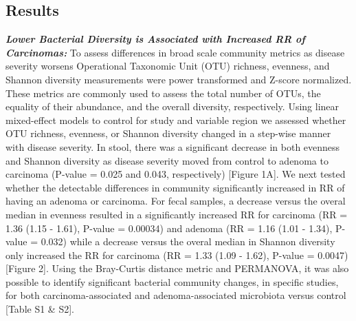 \documentclass[12pt,]{article}
\begin{document}
\newpage

\subsection{Results}\label{results}

\textbf{\emph{Lower Bacterial Diversity is Associated with Increased RR
of Carcinomas:}} To assess differences in broad scale community metrics
as disease severity worsens Operational Taxonomic Unit (OTU) richness,
evenness, and Shannon diversity measurements were power transformed and
Z-score normalized. These metrics are commonly used to assess the total
number of OTUs, the equality of their abundance, and the overall
diversity, respectively. Using linear mixed-effect models to control for
study and variable region we assessed whether OTU richness, evenness, or
Shannon diversity changed in a step-wise manner with disease severity.
In stool, there was a significant decrease in both evenness and Shannon
diversity as disease severity moved from control to adenoma to carcinoma
(P-value = 0.025 and 0.043, respectively) {[}Figure 1A{]}. We next
tested whether the detectable differences in community significantly
increased in RR of having an adenoma or carcinoma. For fecal samples, a
decrease versus the overal median in evenness resulted in a
significantly increased RR for carcinoma (RR = 1.36 (1.15 - 1.61),
P-value = 0.00034) and adenoma (RR = 1.16 (1.01 - 1.34), P-value =
0.032) while a decrease versus the overal median in Shannon diversity
only increased the RR for carcinoma (RR = 1.33 (1.09 - 1.62), P-value =
0.0047) {[}Figure 2{]}. Using the Bray-Curtis distance metric and
PERMANOVA, it was also possible to identify significant bacterial
community changes, in specific studies, for both carcinoma-associated
and adenoma-associated microbiota versus control {[}Table S1 \& S2{]}.
\end{document}
